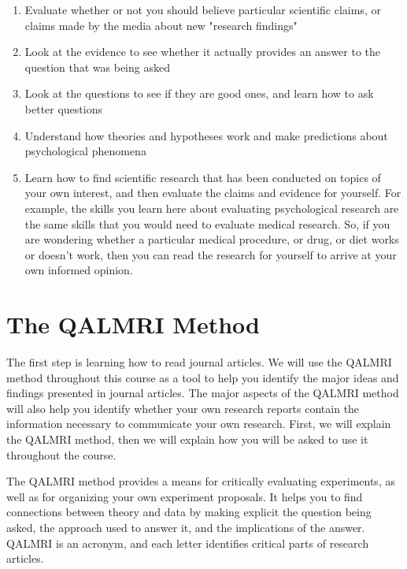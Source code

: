 \begin{enumerate}
\item Evaluate whether or not you should believe particular scientific claims, or claims made by the media about new "research findings"
\item Look at the evidence to see whether it actually provides an answer to the question that was being asked
\item Look at the questions to see if they are good ones, and learn how to ask better questions
\item Understand how theories and hypotheses work and make predictions about psychological phenomena
\item Learn how to find scientific research that has been conducted on topics of your own interest, and then evaluate the claims and evidence for yourself. For example, the skills you learn here about evaluating psychological research are the same skills that you would need to evaluate medical research. So, if you are wondering whether a particular medical procedure, or drug, or diet works or doesn't work, then you can read the research for yourself to arrive at your own informed opinion.
\end{enumerate}

\section{The QALMRI Method}

The first step is learning how to read journal articles. We will use the QALMRI method throughout this course as a tool to help you identify the major ideas and findings presented in journal articles. The major aspects of the QALMRI method will also help you identify whether your own research reports contain the information necessary to communicate your own research. First, we will explain the QALMRI method, then we will explain how you will be asked to use it throughout the course.


The QALMRI method provides a means for critically evaluating experiments, as well as for organizing your own experiment proposals. It helps you to find connections between theory and data by making explicit the question being asked, the approach used to answer it, and the implications of the answer. QALMRI is an acronym, and each letter identifies critical parts of research articles.

